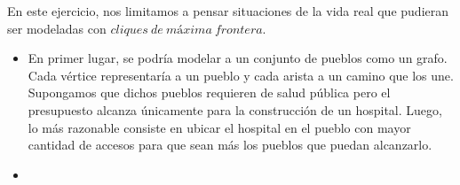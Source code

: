 En este ejercicio, nos limitamos a pensar situaciones de la vida real que pudieran ser modeladas con $cliques\ de\ máxima\ frontera$.
\begin{itemize}
\item En primer lugar, se podría modelar a un conjunto de pueblos como un grafo. Cada vértice representaría a un pueblo y cada arista a un camino que los une. Supongamos que dichos pueblos requieren de salud pública pero el presupuesto alcanza únicamente para la construcción de un hospital. Luego, lo más razonable consiste en ubicar el hospital en el pueblo con mayor cantidad de accesos para que sean más los pueblos que puedan alcanzarlo.

\item 
 
\end{itemize}
